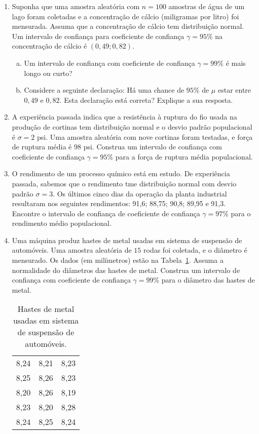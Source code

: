 \documentclass[12pt, a4paper]{article}
\begin{document}
\begin{enumerate}
  \item Suponha que uma amostra aleatória com $n=100$ amostras de água de um lago foram coletadas e a concentração de cálcio (miligramas por litro) foi mensurada. Assuma que a concentração de cálcio tem distribuição normal. Um intervalo de confiança para coeficiente de confiança $\gamma=95\%$ na concentração de cálcio é $(0,49; 0,82)$.
  \begin{enumerate}[(a)]
  	\item Um intervalo de confiança com coeficiente de confiança $\gamma=99\%$ é mais longo ou curto?
  	\item Considere a seguinte declaração: Há uma chance de $95\%$ de $\mu$ estar entre $0,49$ e $0,82$. Esta declaração está correta? Explique a sua resposta. 
  \end{enumerate}
  
  \item A experiência passada indica que a resistência à ruptura do fio usada na produção de cortinas tem distribuição normal e o desvio padrão populacional é $\sigma=2$ psi. Uma amostra aleatória com nove cortinas foram testadas, e força de ruptura média é $98$ psi. Construa um intervalo de confiança com coeficiente de confiança $\gamma=95\%$ para a força de ruptura média populacional.
  
  \item O rendimento de um processo químico está em estudo. De experiência passada, sabemos que o rendimento tme distribuição normal com desvio padrão $\sigma = 3$. Os últimos cinco dias da operação da planta industrial resultaram nos seguintes rendimentos: 91,6; 88,75; 90,8; 89,95 e 91,3. Encontre o intervalo de confiança de coeficiente de confiança $\gamma=97\%$ para o rendimento médio populacional.
  
  \item Uma máquina produz hastes de metal usadas em sistema de suspensão de automóveis. Uma amostra aleatória de $15$ rodas foi coletada, e o diâmetro é mensurado. Os dados (em milímetros) estão na Tabela~\ref{tab:hastes-metal-suspensao}. Assuma a normalidade do diâmetros das hastes de metal. Construa um intervalo de confiança com coeficiente de confiança $\gamma=99\%$ para o diâmetro das hastes de metal.
  \begin{table}[ht]
  \centering
  \begin{tabular}{ccc}
  	\toprule
  	8,24 & 8,21 & 8,23 \\ 
  	8,25 & 8,26 & 8,23 \\ 
  	8,20 & 8,26 & 8,19 \\ 
  	8,23 & 8,20 & 8,28 \\ 
  	8,24 & 8,25 & 8,24 \\ 
  	\bottomrule
  \end{tabular}
  \caption{Hastes de metal usadas em sistema de suspensão de automóveis.} 
  \label{tab:hastes-metal-suspensao}
\end{table}


\end{enumerate}
\end{document}
